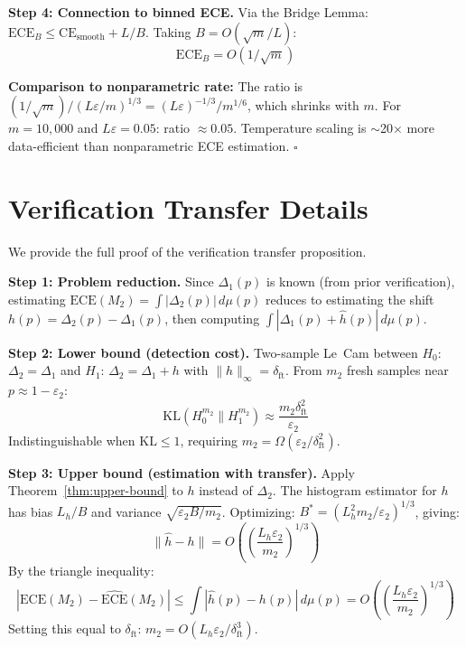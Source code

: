 \documentclass{article}
\newcommand{\ECE}{\mathrm{ECE}}
\newcommand{\CE}{\mathrm{CE}}
\newcommand{\Lip}{L}
\newcommand{\errrate}{\varepsilon}
\newcommand{\nsamples}{m}
\newcommand{\calmap}{\Delta}
\newcommand{\scoredist}{\mu}
\providecommand{\KL}{}
\renewcommand{\KL}{\mathrm{KL}}
\newcommand{\shiftfn}{h}
\newcommand{\ftshift}{\delta_{\mathrm{ft}}}
\newcommand{\Liph}{L_h}
\theoremstyle{definition}
\begin{document}
\textbf{Step 4: Connection to binned ECE.}
Via the Bridge Lemma: $\ECE_B \leq \CE_{\mathrm{smooth}} + \Lip/B$. Taking $B = O(\sqrt{\nsamples}/\Lip)$:
\begin{equation}
\ECE_B = O(1/\sqrt{\nsamples})
\end{equation}

\textbf{Comparison to nonparametric rate:} The ratio is $(1/\sqrt{\nsamples}) / (\Lip\errrate/\nsamples)^{1/3} = (\Lip\errrate)^{-1/3} / \nsamples^{1/6}$, which shrinks with $\nsamples$. For $\nsamples = 10{,}000$ and $\Lip\errrate = 0.05$: ratio $\approx 0.05$. Temperature scaling is $\sim$20$\times$ more data-efficient than nonparametric ECE estimation. $\square$

\section{Verification Transfer Details}
\label{app:transfer}

We provide the full proof of the verification transfer proposition.

\textbf{Step 1: Problem reduction.}
Since $\calmap_1(p)$ is known (from prior verification), estimating $\ECE(M_2) = \int |\calmap_2(p)| \, d\scoredist(p)$ reduces to estimating the shift $\shiftfn(p) = \calmap_2(p) - \calmap_1(p)$, then computing $\int |\calmap_1(p) + \hat{\shiftfn}(p)| \, d\scoredist(p)$.

\textbf{Step 2: Lower bound (detection cost).}
Two-sample Le~Cam between $H_0$: $\calmap_2 = \calmap_1$ and $H_1$: $\calmap_2 = \calmap_1 + \shiftfn$ with $\|\shiftfn\|_\infty = \ftshift$. From $\nsamples_2$ fresh samples near $p \approx 1 - \errrate_2$:
\begin{equation}
\KL(H_0^{\nsamples_2} \| H_1^{\nsamples_2}) \approx \frac{\nsamples_2 \ftshift^2}{\errrate_2}
\end{equation}
Indistinguishable when $\KL \leq 1$, requiring $\nsamples_2 = \Omega(\errrate_2 / \ftshift^2)$.

\textbf{Step 3: Upper bound (estimation with transfer).}
Apply Theorem~\ref{thm:upper-bound} to $\shiftfn$ instead of $\calmap_2$. The histogram estimator for $\shiftfn$ has bias $\Liph / B$ and variance $\sqrt{\errrate_2 B / \nsamples_2}$. Optimizing: $B^* = (\Liph^2 \nsamples_2 / \errrate_2)^{1/3}$, giving:
\begin{equation}
\|\hat{\shiftfn} - \shiftfn\| = O\left(\left(\frac{\Liph \errrate_2}{\nsamples_2}\right)^{1/3}\right)
\end{equation}
By the triangle inequality:
\begin{equation}
\left| \ECE(M_2) - \widehat{\ECE}(M_2) \right| \leq \int |\hat{\shiftfn}(p) - \shiftfn(p)| \, d\scoredist(p) = O\left(\left(\frac{\Liph \errrate_2}{\nsamples_2}\right)^{1/3}\right)
\end{equation}
Setting this equal to $\ftshift$: $\nsamples_2 = O(\Liph \errrate_2 / \ftshift^3)$.
\end{document}
